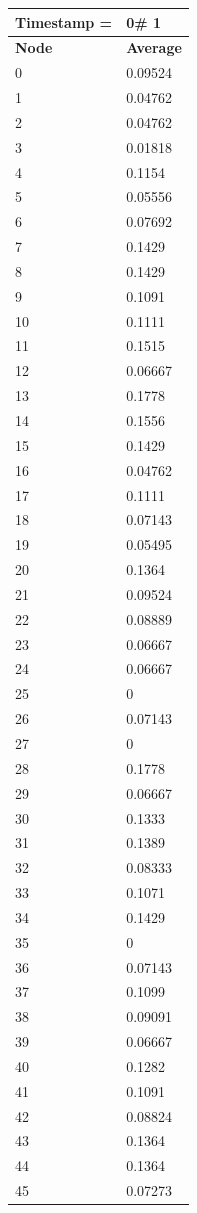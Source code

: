 \begin{tabular}{|l||l|}
\hline
\textbf{Timestamp =} & \textbf{0}\# 1\\\hline
	\textbf{Node} & \textbf{Average} \\ \hline
\hline
	0 & 0.09524 \\ \hline
	1 & 0.04762 \\ \hline
	2 & 0.04762 \\ \hline
	3 & 0.01818 \\ \hline
	4 & 0.1154 \\ \hline
	5 & 0.05556 \\ \hline
	6 & 0.07692 \\ \hline
	7 & 0.1429 \\ \hline
	8 & 0.1429 \\ \hline
	9 & 0.1091 \\ \hline
	10 & 0.1111 \\ \hline
	11 & 0.1515 \\ \hline
	12 & 0.06667 \\ \hline
	13 & 0.1778 \\ \hline
	14 & 0.1556 \\ \hline
	15 & 0.1429 \\ \hline
	16 & 0.04762 \\ \hline
	17 & 0.1111 \\ \hline
	18 & 0.07143 \\ \hline
	19 & 0.05495 \\ \hline
	20 & 0.1364 \\ \hline
	21 & 0.09524 \\ \hline
	22 & 0.08889 \\ \hline
	23 & 0.06667 \\ \hline
	24 & 0.06667 \\ \hline
	25 & 0 \\ \hline
	26 & 0.07143 \\ \hline
	27 & 0 \\ \hline
	28 & 0.1778 \\ \hline
	29 & 0.06667 \\ \hline
	30 & 0.1333 \\ \hline
	31 & 0.1389 \\ \hline
	32 & 0.08333 \\ \hline
	33 & 0.1071 \\ \hline
	34 & 0.1429 \\ \hline
	35 & 0 \\ \hline
	36 & 0.07143 \\ \hline
	37 & 0.1099 \\ \hline
	38 & 0.09091 \\ \hline
	39 & 0.06667 \\ \hline
	40 & 0.1282 \\ \hline
	41 & 0.1091 \\ \hline
	42 & 0.08824 \\ \hline
	43 & 0.1364 \\ \hline
	44 & 0.1364 \\ \hline
	45 & 0.07273 \\ \hline
\end{tabular}
